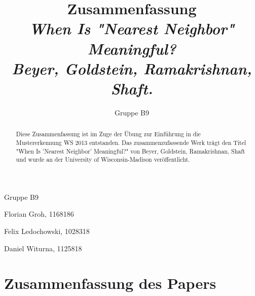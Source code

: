 \documentclass{article}
\begin{document}
\title{Zusammenfassung \\ \textit{When Is "Nearest Neighbor" Meaningful? \\ Beyer, Goldstein, Ramakrishnan, Shaft.}}
\author{Gruppe B9}

\maketitle

\begin{abstract}
Diese Zusammenfassung ist im Zuge der Übung zur Einführung in die Mustererkennung WS 2013 entstanden. Das zusammenzufassende Werk trägt den Titel "When Is 'Nearest Neighbor' Meaningful?" von Beyer, Goldstein, Ramakrishnan, Shaft und wurde an der University of Wisconsin-Madison veröffentlicht.
\end{abstract}

\vfill

Gruppe B9

Florian Groh, 1168186

Felix Ledochowski, 1028318

Daniel Witurna, 1125818

\pagebreak

\section{Zusammenfassung des Papers}
\end{document}
